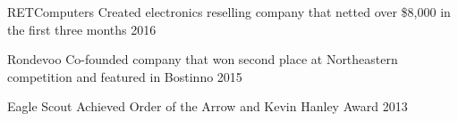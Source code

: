 

\begin{cvhonors}

  \cvhonor
    {RETComputers} %
    {Created electronics reselling company that netted over \$8,000 in the first three months} %
    {} %
    {2016} %

  \cvhonor
    {Rondevoo} %
    {Co-founded company that won second place at Northeastern competition and featured in Bostinno} %
    {} %
    {2015} %

  \cvhonor
    {Eagle Scout} %
    {Achieved Order of the Arrow and Kevin Hanley Award} %
    {} %
    {2013} %

\end{cvhonors}
